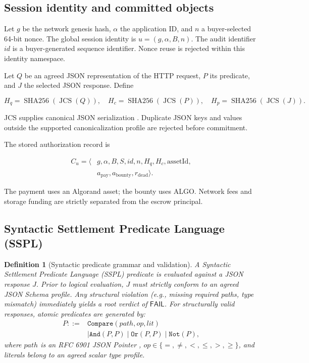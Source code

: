 \documentclass[fleqn,10pt,lineno]{wlpeerj}
\newtheorem{definition}{Definition}
\newcommand{\JCS}{\operatorname{JCS}}
\newcommand{\Hash}{\operatorname{SHA256}}
\begin{document}
\subsection{Session identity and committed objects}

Let $g$ be the network genesis hash, $\alpha$ the application ID, and $n$ a buyer-selected 64-bit nonce. The global session identity is $u=(g,\alpha,B,n)$. The audit identifier $id$ is a buyer-generated sequence identifier. Nonce reuse is rejected within this identity namespace.

Let $Q$ be an agreed JSON representation of the HTTP request, $P$ its predicate, and $J$ the selected JSON response. Define

\begin{equation}
 H_q=\Hash(\JCS(Q)),\quad
 H_c=\Hash(\JCS(P)),\quad
 H_p=\Hash(\JCS(J)).
\end{equation}

JCS supplies canonical JSON serialization \citep{rfc8785}. Duplicate JSON keys and values outside the supported canonicalization profile are rejected before commitment.

The stored authorization record is

\begin{equation}
\begin{split}
 C_u=\langle &g,\alpha,B,S,id,n,H_q,H_c,\mathrm{assetId},\\
             &a_{\mathrm{pay}},a_{\mathrm{bounty}},r_{\mathrm{dead}}
             \rangle .
\end{split}
\end{equation}

The payment uses an Algorand asset; the bounty uses ALGO. Network fees and storage funding are strictly separated from the escrow principal.

\subsection{Syntactic Settlement Predicate Language (SSPL)}

\begin{definition}[Syntactic predicate grammar and validation]
A Syntactic Settlement Predicate Language (SSPL) predicate is evaluated against a JSON response $J$. Prior to logical evaluation, $J$ must strictly conform to an agreed JSON Schema profile. Any structural violation (e.g., missing required paths, type mismatch) immediately yields a root verdict of $\mathsf{FAIL}$. 
For structurally valid responses, atomic predicates are generated by:
\begin{align*}
P ::= {}&\texttt{Compare}(\mathit{path},\mathit{op},\mathit{lit})\\
       &\mid\texttt{And}(P,P)\mid\texttt{Or}(P,P)\mid\texttt{Not}(P),
\end{align*}
where $\mathit{path}$ is an RFC 6901 JSON Pointer \citep{rfc6901}, $\mathit{op}\in\{=,\ne,<,\le,>,\ge\}$, and literals belong to an agreed scalar type profile.
\end{definition}
\end{document}
